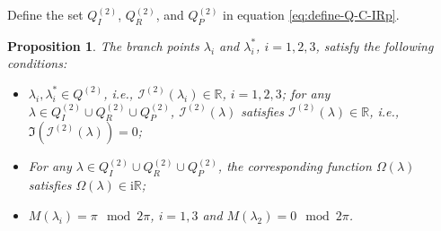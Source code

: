 \documentclass[11pt,reqno]{amsart}
\newcommand{\ii}{\mathrm{i}}
\newtheorem{prop}{Proposition}
\numberwithin{equation}{section}
\begin{document}
Define the set $ Q^{(2)} _{I}$, $ Q^{(2)} _{R}$, and $ Q^{(2)} _{P}$ in equation \eqref{eq:define-Q-C-IRp}.



\begin{prop}\label{prop:Q-M-cn}
	The branch points $\lambda_{i}$ and $\lambda_{i}^*$, $i=1,2,3$, satisfy the following conditions:
	\begin{itemize}
		\item[(a)] $\lambda_i,\lambda_i^*\in Q^{(2)}$, i.e., $\mathcal{I}^{(2)}(\lambda_i)\in \mathbb{R}$, $i=1,2,3$; for any $\lambda\in  Q^{(2)}_{I}\cup  Q^{(2)} _{R}\cup  Q^{(2)} _{P}$, $\mathcal{I}^{(2)}(\lambda)$ satisfies $\mathcal{I}^{(2)}(\lambda)\in \mathbb{R}$, i.e., $\Im(\mathcal{I}^{(2)}(\lambda))=0$;
		\item[(b)] For any $\lambda\in  Q^{(2)}_{I}\cup  Q^{(2)} _{R}\cup  Q^{(2)} _{P}$, 
		 the corresponding function $\Omega(\lambda)$ satisfies $\Omega(\lambda)\in \ii \mathbb{R}$;
		\item[(c)] $M(\lambda_i)=\pi \mod 2\pi $, $i=1,3$ and $M(\lambda_2)=0 \mod 2\pi $.
	\end{itemize}
\end{prop}
\end{document}
